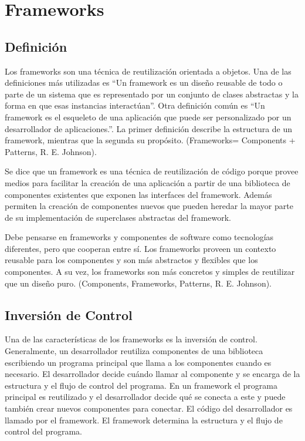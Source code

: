 
\section{Frameworks}


\subsection{Definición}


Los frameworks son una técnica de reutilización orientada a objetos.  Una de las
definiciones más utilizadas es ``Un framework es un diseño reusable de todo o
parte de un sistema que es representado por un conjunto de clases abstractas y
la forma en que esas instancias interactúan''. Otra definición común es ``Un
framework es el esqueleto de una aplicación que puede ser personalizado por un
desarrollador de aplicaciones.''. La primer definición describe la estructura de
un framework, mientras que la segunda su propósito. (Frameworks= Components +
Patterns, R. E. Johnson).

Se dice que un framework es una técnica de reutilización de código porque provee
medios para facilitar la creación de una aplicación a partir de una biblioteca
de componentes existentes que exponen las interfaces del framework. Además
permiten la creación de componentes nuevos que pueden heredar la mayor parte de
su implementación de superclases abstractas del framework.


Debe pensarse en frameworks y componentes de software como tecnologías
diferentes, pero que cooperan entre sí. Los frameworks proveen un contexto
reusable para los componentes y son más abstractos y flexibles que los
componentes. A su vez, los frameworks son  más concretos y simples de reutilizar
que un diseño puro. (Components, Frameworks, Patterns, R. E. Johnson).

\subsection{Inversión de Control}
Una de las características de los frameworks es la inversión de control.
Generalmente, un desarrollador reutiliza componentes de una biblioteca 
escribiendo un programa principal que llama a los componentes cuando es 
necesario. El desarrollador decide cuándo llamar al componente y se encarga de
la estructura y el flujo de control del programa. En un framework el programa
principal es reutilizado y el desarrollador decide qué se conecta a este y
puede también crear nuevos componentes para conectar. El código del
desarrollador es llamado por el framework. El framework determina la estructura
y el flujo de control del programa.

